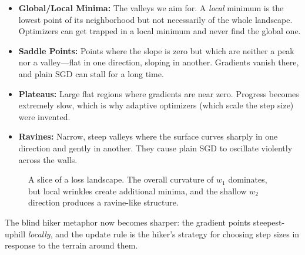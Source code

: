 \documentclass{tufte-handout}
\begin{document}
\begin{itemize}[leftmargin=*, itemsep=2pt]
    \item \textbf{Global/Local Minima:} The valleys we aim for. A \emph{local} minimum is the lowest point of its neighborhood but not necessarily of the whole landscape. Optimizers can get trapped in a local minimum and never find the global one.
    \item \textbf{Saddle Points:} Points where the slope is zero but which are neither a peak nor a valley---flat in one direction, sloping in another. Gradients vanish there, and plain SGD can stall for a long time.
    \item \textbf{Plateaus:} Large flat regions where gradients are near zero. Progress becomes extremely slow, which is why adaptive optimizers (which scale the step size) were invented.
    \item \textbf{Ravines:} Narrow, steep valleys where the surface curves sharply in one direction and gently in another. They cause plain SGD to oscillate violently across the walls.
\end{itemize}

\begin{figure}[htbp]
\centering
{}
\caption{A slice of a loss landscape. The overall curvature of $w_1$ dominates, but local wrinkles create additional minima, and the shallow $w_2$ direction produces a ravine-like structure.}
\label{fig:loss_landscape}
\end{figure}

The blind hiker metaphor now becomes sharper: the gradient points steepest-uphill \emph{locally}, and the update rule is the hiker's strategy for choosing step sizes in response to the terrain around them.
\end{document}

